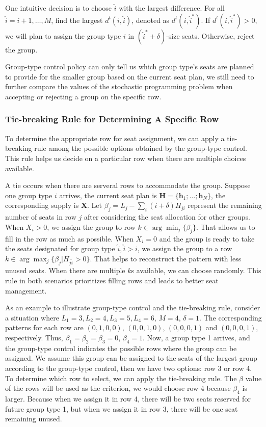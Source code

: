 One intuitive decision is to choose $\hat{i}$ with the largest difference. For all $\hat{i} = {i}+1, \ldots, M$, find the largest $d^{t}({i},\hat{i})$, denoted as $d^{t}({i},\hat{i}^{*})$. If $d^{t}({i},\hat{i}^{*}) >0$, we will plan to assign the group type ${i}$ in $(\hat{i}^{*}+\delta)$-size seats. Otherwise, reject the group.

Group-type control policy can only tell us which group type's seats are planned to provide for the smaller group based on the current seat plan, we still need to further compare the values of the stochastic programming problem when accepting or rejecting a group on the specific row. 

\subsubsection{Tie-breaking Rule for Determining A Specific Row}\label{tie-break}
To determine the appropriate row for seat assignment, we can apply a tie-breaking rule among the possible options obtained by the group-type control. This rule helps us decide on a particular row when there are multiple choices available.

A tie occurs when there are serveral rows to accommodate the group. Suppose one group type ${i}$ arrives, the current seat plan is $\bm{H} = \{\bm{h}_{1}; \ldots; \bm{h}_{N}\}$, the corresponding supply is $\bm{X}$. Let $\beta_{j} = L_j - \sum_{i} (i+\delta) H_{ji}$ represent the remaining number of seats in row $j$ after considering the seat allocation for other groups. When $X_{i} > 0$, we assign the group to row $k \in \arg \min_{j} \{\beta_{j}\}$. That allows us to fill in the row as much as possible. When $X_{i} = 0$ and the group is ready to take the seats designated for group type $\hat{i}, \hat{i}>i$, we assign the group to a row $k \in \arg \max_{j} \{\beta_{j}| H_{j \hat{i}}>0\}$. That helps to reconstruct the pattern with less unused seats. When there are multiple $k$s available, we can choose randomly. This rule in both scenarios prioritizes filling rows and leads to better seat management.

As an example to illustrate group-type control and the tie-breaking rule, consider a situation where $L_1 =3, L_2 = 4, L_3 =5, L_4 =6$, $M =4$, $\delta =1$. The corresponding patterns for each row are $(0,1,0,0)$, $(0,0,1,0)$, $(0,0,0,1)$ and $(0,0,0,1)$, respectively. Thus, $\beta_1 = \beta_2 = \beta_3 =0$, $\beta_4 =1$. Now, a group type 1 arrives, and the group-type control indicates the possible rows where the group can be assigned. We assume this group can be assigned to the seats of the largest group according to the group-type control, then we have two options: row 3 or row 4. To determine which row to select, we can apply the tie-breaking rule. The $\beta$ value of the rows will be used as the criterion, we would choose row 4 because $\beta_4$ is larger. Because when we assign it in row 4, there will be two seats reserved for future group type 1, but when we assign it in row 3, there will be one seat remaining unused.

